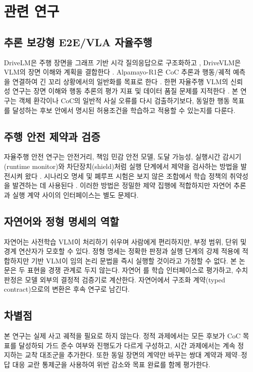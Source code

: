 \section{관련 연구}
\label{sec:related}

\subsection{추론 보강형 E2E/VLA 자율주행}

DriveLM은 주행 장면을 그래프 기반 시각 질의응답으로 구조화하고 \cite{sima2024drivelm}, DriveVLM은 VLM의 장면 이해와 계획을 결합한다 \cite{tian2024drivevlm}. Alpamayo-R1은 CoC 추론과 행동/궤적 예측을 연결하여 긴 꼬리 상황에서의 일반화를 목표로 한다 \cite{wang2025alpamayo}. 한편 자율주행 VLM의 신뢰성 연구는 장면 이해와 행동 추론의 평가 지표 및 데이터 품질 문제를 지적한다 \cite{xie2025drivebench}. 본 연구는 객체 환각이나 CoC의 일반적 사실 오류를 다시 검출하기보다, 동일한 행동 목표를 달성하는 후보 안에서 명시된 허용조건을 학습하고 적용할 수 있는지를 다룬다.

\subsection{주행 안전 제약과 검증}

자율주행 안전 연구는 안전거리, 책임 민감 안전 모델, 도달 가능성, 실행시간 감시기(runtime monitor)와 차단장치(shield)처럼 실행 단계에서 제약을 검사하는 방법을 발전시켜 왔다 \cite{shalev2017rss,katz2019marabou}. 시나리오 명세 및 폐루프 시험은 보지 않은 조합에서 학습 정책의 취약성을 발견하는 데 사용된다 \cite{fremont2019scenic,zhang2023cat}. 이러한 방법은 정밀한 제약 집행에 적합하지만 자연어 추론과 실행 계약 사이의 인터페이스는 별도 문제다.

\subsection{자연어와 정형 명세의 역할}

자연어는 사전학습 VLM이 처리하기 쉬우며 사람에게 편리하지만, 부정 범위, 단위 및 경계 연산자가 모호할 수 있다. 정형 명세는 정확한 판정과 실행 단계의 강제 적용에 적합하지만 기반 VLM이 임의 논리 문법을 즉시 실행할 것이라고 가정할 수 없다. 본 논문은 두 표현을 경쟁 관계로 두지 않는다. 자연어 \sccoc{}를 학습 인터페이스로 평가하고, 수치 판정은 모델 외부의 결정적 검증기로 계산한다. 자연어에서 구조화 계약(typed contract)으로의 변환은 후속 연구로 남긴다.

\subsection{차별점}

본 연구는 실제 사고 궤적을 필요로 하지 않는다. 정적 과제에서는 모든 후보가 CoC 목표를 달성하되 가드 준수 여부와 진행도가 다르게 구성하고, 시간 과제에서는 계속 정지하는 교착 대조군을 추가한다. 또한 동일 장면의 계약만 바꾸는 쌍대 계약과 제약--정답 대응 교란 통제군을 사용하여 위반 감소와 목표 완료를 함께 평가한다.
